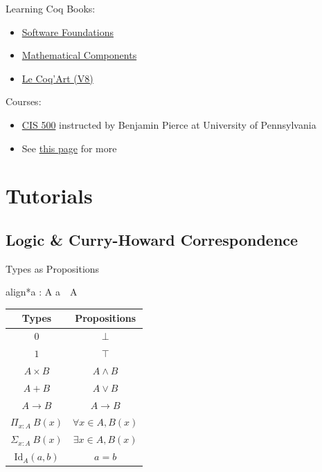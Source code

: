 \documentclass[usenames,xcolor=svgnames,11pt,sans,aspectratio=169]{beamer}
\newcommand{\boxedeq}[1]{\begin{empheq}[box=\fbox]{align*}#1\end{empheq}}
\begin{document}
\begin{frame}{Learning Coq}
  Books:
  \begin{itemize}
    \item \href{https://softwarefoundations.cis.upenn.edu}{Software Foundations}
    \item \href{https://math-comp.github.io/mcb/book.pdf}{Mathematical Components}
    \item \href{https://www.labri.fr/perso/casteran/CoqArt/coqartF.pdf}{Le Coq'Art (V8)}
  \end{itemize}

  Courses:
  \begin{itemize}
    \item \href{https://www.seas.upenn.edu/~cis500/current/index.html}{CIS 500} instructed by Benjamin Pierce at University of Pennsylvania
    \item See \href{https://github.com/coq/coq/wiki/CoqInTheClassroom}{this page} for more
  \end{itemize}
\end{frame}

\section{Tutorials}

\subsection{Logic \& Curry-Howard Correspondence}

\begin{frame}{Types as Propositions}
  \boxedeq{a : A \iff a~~A}

  \begin{center}
    \begin{tabular}{cc}
      Types & Propositions \\
      \hline
      $0$ & $\bot$ \\
      $1$ & $\top$ \\
      $A \times B$ & $A \land B$ \\
      $A + B$ & $A \lor B$ \\
      $A \to B$ & $A \to B$ \\
      $\Pi_{x: A}~B(x)$ & $\forall x \in A, B(x)$ \\
      $\Sigma_{x: A}~B(x)$ & $\exists x \in A, B(x)$ \\
      $\text{Id}_A(a, b)$ & $a = b$
    \end{tabular}
  \end{center}
\end{frame}
\end{document}
